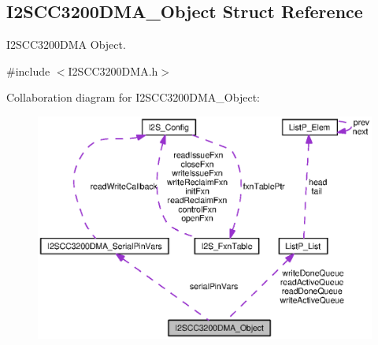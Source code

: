 \subsection{I2\+S\+C\+C3200\+D\+M\+A\+\_\+\+Object Struct Reference}
\label{struct_i2_s_c_c3200_d_m_a___object}


I2\+S\+C\+C3200\+D\+M\+A Object.  




{\ttfamily \#include $<$I2\+S\+C\+C3200\+D\+M\+A.\+h$>$}



Collaboration diagram for I2\+S\+C\+C3200\+D\+M\+A\+\_\+\+Object\+:
\nopagebreak
\begin{figure}[H]
\begin{center}
\leavevmode
\includegraphics[width=350pt]{struct_i2_s_c_c3200_d_m_a___object__coll__graph}
\end{center}
\end{figure}
